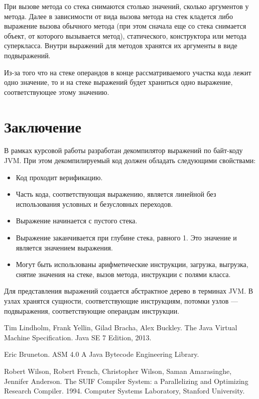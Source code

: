 При вызове метода со стека снимаются столько значений, сколько аргументов у метода. Далее в зависимости от вида вызова метода на стек кладется либо выражение вызова обычного метода (при этом сначала еще со стека снимается объект, от которого вызывается метод), статического, конструктора или метода суперкласса. Внутри выражений для методов хранятся их аргументы в виде подвыражений.

Из-за того что на стеке операндов в конце рассматриваемого участка кода лежит одно значение, то и на стеке выражений будет храниться одно выражение, соответствующее этому значению.

\section*{Заключение}

В рамках курсовой работы разработан декомпилятор выражений по байт-коду JVM. При этом декомпилируемый код должен обладать следующими свойствами:
\begin{itemize}
\item Код проходит верификацию.
\item Часть кода, соответствующая выражению, является линейной без использования условных и безусловных переходов.
\item Выражение начинается с пустого стека.
\item Выражение заканчивается при глубине стека, равного 1. Это значение и является значением выражения.
\item Могут быть использованы арифметические инструкции, загрузка, выгрузка, снятие значения на стеке, вызов метода, инструкции с полями класса. 
\end{itemize}
Для представления выражений создается абстрактное дерево в терминах JVM. В узлах хранятся сущности, соответствующие инструкциям, потомки узлов --- подвыражения, соответствующие операндам инструкции.

\begin{thebibliography}{99}
Tim Lindholm, Frank Yellin, Gilad Bracha, Alex Buckley.
The Java Virtual Machine Specification.
Java SE 7 Edition, 2013.

Eric Bruneton.
ASM 4.0 A Java Bytecode Engineering Library.

Robert Wilson, Robert French, Christopher Wilson, Saman Amarasinghe, Jennifer Anderson. The SUIF Compiler System: a Parallelizing and Optimizing Research Compiler. 1994. Computer Systems Laboratory, Stanford University.
\end{thebibliography}


